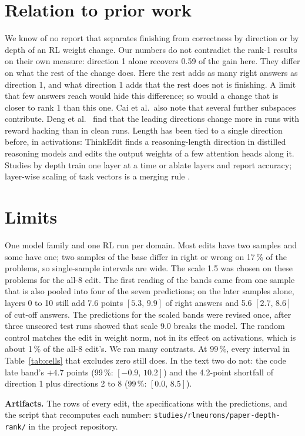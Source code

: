 \documentclass[10pt]{article}
\newcommand{\ci}[2]{$[#1,\,#2]$}
\begin{document}
\section{Relation to prior work}

We know of no report that separates finishing from correctness by direction or by depth of an RL weight
change. Our numbers do not contradict the rank-1 results on their own measure: direction 1 alone recovers
0.59 of the gain here. They differ on what the rest of the change does. Here the rest adds as many
right answers as direction 1, and what direction 1 adds that the rest does not is finishing. A limit that few
answers reach would hide this difference; so would a change that is closer to rank 1 than this one. Cai et
al.\ also note that several further subspaces contribute. Deng et al.\ \cite{deng2026directional} find that
the leading directions change more in runs with reward hacking than in clean runs. Length has been tied to a
single direction before, in activations: ThinkEdit \cite{sun2025thinkedit} finds a reasoning-length direction
in distilled reasoning models and edits the output weights of a few attention heads along it. Studies by depth
train one layer at a time \cite{zhang2026onelayer} or ablate layers \cite{nepal2025layer} and report
accuracy; layer-wise scaling of task vectors is a merging rule \cite{wang2024lines}.

\section{Limits}

One model family and one RL run per domain. Most edits have two samples and some have one; two samples of the
base differ in right or wrong on 17\,\% of the problems, so single-sample intervals are wide. The scale 1.5 was
chosen on these problems for the all-8 edit. The first reading of the bands came from one sample that is also
pooled into four of the seven predictions; on the later samples alone, layers 0 to 10 still add 7.6 points
\ci{5.3}{9.9} of right answers and 5.6 \ci{2.7}{8.6} of cut-off answers. The predictions for the scaled bands
were revised once, after three unscored test runs showed that scale 9.0 breaks the model. The random control
matches the edit in weight norm, not in its effect on activations, which is about 1\,\% of the all-8 edit's.
We ran many contrasts. At 99\,\%, every interval in Table~\ref{tab:cells} that excludes zero still does. In
the text two do not: the code late band's $+4.7$ points (99\,\%: \ci{-0.9}{10.2}) and the 4.2-point
shortfall of direction 1 plus directions 2 to 8 (99\,\%: \ci{0.0}{8.5}).

\textbf{Artifacts.} The rows of every edit, the specifications with the predictions, and the script that
recomputes each number: \texttt{studies/rlneurons/paper-depth-rank/} in the project repository.



\end{document}
